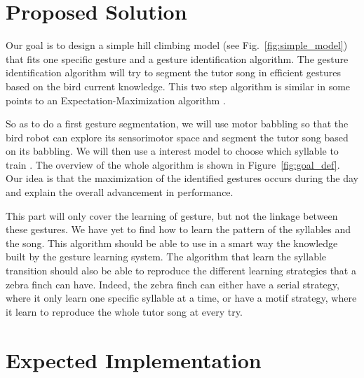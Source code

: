 \documentclass[a4paper, 11pt]{article}
\begin{document}
\section*{Proposed Solution}

Our goal is to design a simple hill climbing model (see
Fig.~\ref{fig:simple_model}) that fits one specific gesture and a gesture
identification algorithm. The gesture identification algorithm will try to
segment the tutor song in efficient gestures based on the bird current
knowledge. This two step algorithm is similar in some points to an
Expectation-Maximization algorithm \parencite{dempster_maximum_1977}.

So as to do a first gesture segmentation, we will use motor babbling so that the
bird robot can explore its sensorimotor space and segment the tutor song based
on its babbling. We will then use a interest model to choose which syllable to
train \parencite{baranes_active_2013}. The overview of the whole algorithm is
shown in Figure~\ref{fig:goal_def}. Our idea is that the maximization of the
identified gestures occurs during the day and explain the overall advancement
in performance.

This part will only cover the learning of gesture, but not the linkage between
these gestures. We have yet to find how to learn the pattern of the syllables
and the song. This algorithm should be able to use in a smart way the knowledge
built by the gesture learning system. The algorithm that learn the syllable
transition should also be able to reproduce the different learning strategies
that a zebra finch can have. Indeed, the zebra finch can either have a serial
strategy, where it only learn one specific syllable at a time, or have a motif
strategy, where it learn to reproduce the whole tutor song at every try.

\begin{figure}[tb]
\end{figure}
\begin{figure}[tb]
\end{figure}

\section*{Expected Implementation}
\end{document}
